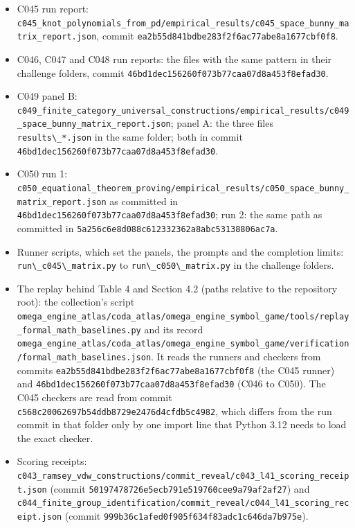 \documentclass[
  11pt,
]{article}
\newcommand{\passthrough}[1]{#1}
\providecommand{\tightlist}{%
  \setlength{\itemsep}{0pt}\setlength{\parskip}{0pt}}
\begin{document}
\begin{itemize}
\tightlist
\item
  C045 run report:
  \nolinkurl{c045_knot_polynomials_from_pd/empirical_results/c045_space_bunny_matrix_report.json},
  commit \nolinkurl{ea2b55d841bdbe283f2f6ac77abe8a1677cbf0f8}.
\item
  C046, C047 and C048 run reports: the files with the same pattern in
  their challenge folders, commit
  \nolinkurl{46bd1dec156260f073b77caa07d8a453f8efad30}.
\item
  C049 panel B:
  \nolinkurl{c049_finite_category_universal_constructions/empirical_results/c049_space_bunny_matrix_report.json};
  panel A: the three files \passthrough{\lstinline!results\_*.json!} in
  the same folder; both in commit
  \nolinkurl{46bd1dec156260f073b77caa07d8a453f8efad30}.
\item
  C050 run 1:
  \nolinkurl{c050_equational_theorem_proving/empirical_results/c050_space_bunny_matrix_report.json}
  as committed in \nolinkurl{46bd1dec156260f073b77caa07d8a453f8efad30};
  run 2: the same path as committed in
  \nolinkurl{5a256c6e8d088c612332362a8abc53138806ac7a}.
\item
  Runner scripts, which set the panels, the prompts and the completion
  limits: \passthrough{\lstinline!run\_c045\_matrix.py!} to
  \passthrough{\lstinline!run\_c050\_matrix.py!} in the challenge
  folders.
\item
  The replay behind Table 4 and Section 4.2 (paths relative to the
  repository root): the collection's script
  \nolinkurl{omega_engine_atlas/coda_atlas/omega_engine_symbol_game/tools/replay_formal_math_baselines.py}
  and its record
  \nolinkurl{omega_engine_atlas/coda_atlas/omega_engine_symbol_game/verification/formal_math_baselines.json}.
  It reads the runners and checkers from commits
  \nolinkurl{ea2b55d841bdbe283f2f6ac77abe8a1677cbf0f8} (the C045 runner)
  and \nolinkurl{46bd1dec156260f073b77caa07d8a453f8efad30} (C046 to
  C050). The C045 checkers are read from commit
  \nolinkurl{c568c20062697b54ddb8729e2476d4cfdb5c4982}, which differs
  from the run commit in that folder only by one import line that Python
  3.12 needs to load the exact checker.
\item
  Scoring receipts:
  \nolinkurl{c043_ramsey_vdw_constructions/commit_reveal/c043_l41_scoring_receipt.json}
  (commit \nolinkurl{50197478726e5ecb791e519760cee9a79af2af27}) and
  \nolinkurl{c044_finite_group_identification/commit_reveal/c044_l41_scoring_receipt.json}
  (commit \nolinkurl{999b36c1afed0f905f634f83adc1c646da7b975e}).
\end{itemize}
\end{document}
